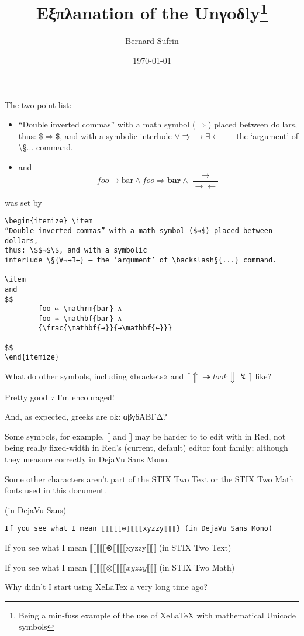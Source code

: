 \documentclass[11pt,a4paper]{article}
\author{Bernard Sufrin}
\title{Eξπλanation of the Unγoδly\footnote{Being a min-fuss example of the use of
XeLaTeX
with mathematical Unicode symbols}}
\date{\today}
\def\§#1{\symbolfamily{#1}}
\def\§#1{${#1}$}
\begin{document}
\maketitle

The two-point list:

\begin{itemize} \item
“Double inverted commas” with a math symbol ($⇒$) placed between dollars,
thus: \$$⇒$\$, and with a symbolic
interlude \§{∀⇛→∃←} — the ‘argument’ of \backslash§{...} command.

\item
and 
$$
        foo ↦ \mathrm{bar} ∧
        foo ⇒ \mathbf{bar} ∧
        {\frac{\mathbf{→}}{→\mathbf{←}}}
$$
\end{itemize}
was set by
\begin{verbatim}
\begin{itemize} \item
“Double inverted commas” with a math symbol ($⇒$) placed between dollars,
thus: \$$⇒$\$, and with a symbolic
interlude \§{∀⇛→∃←} — the ‘argument’ of \backslash§{...} command.

\item
and 
$$
        foo ↦ \mathrm{bar} ∧
        foo ⇒ \mathbf{bar} ∧
        {\frac{\mathbf{→}}{→\mathbf{←}}}

$$
\end{itemize}
\end{verbatim}
What do other symbols, including «brackets» and  $ ⌈⇑ ↠ look ⇓  ↯ ⌉$ like?


Pretty good $∵$ I'm encouraged!

And, as expected, greeks are ok:  αβγδΑΒΓΔ?

Some symbols, for example, $⟦$ and $⟧$ may be harder to
to edit with in Red, not being really fixed-width in
Red's (current, default) editor
font family; although they measure correctly in
DejaVu Sans Mono.

Some other characters aren't part of the STIX Two Text
or the STIX Two Math fonts used in this document.

\bgroup{} (in DejaVu Sans)\egroup

\verb/If you see what I mean ⟦⟦⟦⟦⟦⊗⟦⟦⟦⟦xyzzy⟦⟦⟦} (in DejaVu Sans Mono)/

If you see what I mean ⟦⟦⟦⟦⟦⊗⟦⟦⟦⟦xyzzy⟦⟦⟦ (in STIX Two Text)

If you see what I mean $⟦⟦⟦⟦⟦⊗⟦⟦⟦⟦xyzzy⟦⟦⟦$ (in STIX Two Math)




Why didn't I start using XeLaTex a very long time ago?
\end{document}
